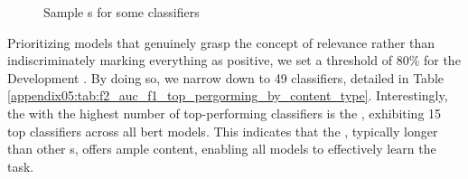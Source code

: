 \begin{figure}[ht]
    \centering
    \hfill
    \hfill
    \caption{Sample \auc{}s for some classifiers}
    \label{fig:07_vsi_sample_auc}
\end{figure}


Prioritizing models that genuinely grasp the concept of relevance rather than indiscriminately marking everything as positive, we set a threshold of 80\% for the Development \auc{}. By doing so, we narrow down to 49 classifiers, detailed in Table \ref{appendix05:tab:f2_auc_f1_top_pergorming_by_content_type}.
Interestingly, the \contentType{} with the highest number of top-performing classifiers is the \trafilaturaFulltext{}, exhibiting 15 top classifiers across all \gls{bert} models.
This indicates that the \trafilaturaFulltext{}, typically longer than other \contentType{}s, offers ample content, enabling all models to effectively learn the task.

